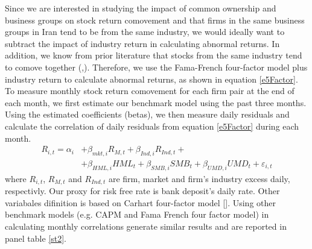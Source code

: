 Since we are interested in studying the impact of common ownership and business groups on stock return comovement and that firms in the same business groups in Iran tend to be from the same industry, we would ideally want to subtract the impact of industry return in calculating abnormal returns. In addition, we know from prior literature that stocks from the same industry tend to comove together {(\cite{king1966market},\cite{meyers1973re})}. Therefore, we use the Fama-French four-factor model plus industry return to calculate abnormal returns, as shown in equation \ref{e5Factor}. To measure monthly stock return comovement for each firm pair at the end of each month, we first estimate our benchmark model using the past three months. Using the estimated coefficients (betas), we then measure daily residuals and calculate the correlation of daily residuals from equation \ref{e5Factor} during each month. 
	\begin{equation}
		\begin{split}
			R_{i,t} =\alpha _{i}&+\beta _{mkt,i}{\mathit {R}}_{M,t} + \beta_{Ind,i}{\mathit {R}}_{Ind,t} + \\
			&+\beta _{HML,i}{\mathit {HML}}_{t}+\beta _{SMB,i}{\mathit {SMB}}_{t}+\beta _{UMD,i}{\mathit {UMD}}_{t}+ \varepsilon_{i,t}
		\end{split}
		\label{e5Factor}
	\end{equation}
	where $ R_{i,t} $, $ R_{M,t} $ and $ R_{Ind,t} $ are firm, market and firm's industry excess daily, respectivly. Our proxy for risk free rate is bank deposit's daily rate. Other variabales difinition is based on Carhart four-factor model [\cite{Carhart4Factor}]. Using other benchmark models (e.g. CAPM and Fama French four factor model) in calculating monthly correlations generate similar results and are reported in panel  table \ref{st2}. 
	
	
	
	
%			



\FloatBarrier


